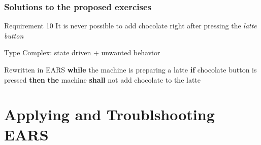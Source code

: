 \documentclass[aspectratio=169]{beamer}
\newcommand{\earsw}[3]{{\bf \color{mygreen}if} {#1} {\bf \color{mygreen}then} {\bf \color{mypurple}the} {#2} {\bf \color{mypurple}shall} {#3}}
\begin{document}
\begin{frame}
  \frametitle{Solutions to the proposed exercises}
  \begin{block}{Requirement 10}
    It is never possible to \alert{add chocolate} right after pressing the \emph{latte button}
  \end{block}
  \begin{block}{Type}
   Complex: state driven + unwanted behavior
  \end{block}
  \begin{block}{Rewritten in EARS}
   {\bf \color{mygreen} while} the machine is preparing a latte \earsw{chocolate button is pressed}{machine}{not add chocolate to the latte}
  \end{block}
\end{frame}

\section*{Applying and Troublshooting EARS}
\end{document}
